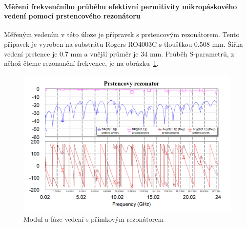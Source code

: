 \documentclass[11pt,a4paper]{article}
\begin{document}
\paragraph*{Měření frekvenčního průběhu efektivní permitivity mikropáskového vedení pomocí prstencového rezonátoru} Měřeným vedením v této úloze je přípravek s prstencovým rezonátorem. Tento přípavek je vyroben na substrátu Rogers RO4003C s tloušťkou 0.508 mm. Šířka vedení prstence je 0.7 mm a vnější průměr je 34 mm. Průběh S-parametrů, z něhož čteme rezonanční frekvence, je na obrázku~\ref{fig:prstencovy-rezonator}.
\begin{figure}[!ht]
\centering
\includegraphics[width=\textwidth]{src/prstencovy-rezonator.png}
\caption{Modul a fáze vedení s přímkovým rezonátorem}
\label{fig:prstencovy-rezonator}
\end{figure}
\end{document}
